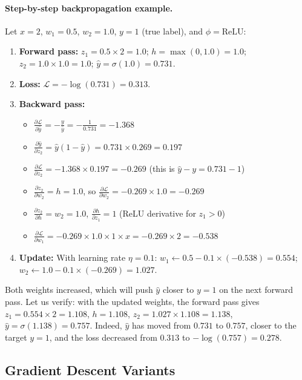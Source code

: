 \paragraph{Step-by-step backpropagation example.} Let $x = 2$, $w_1 = 0.5$, $w_2 = 1.0$, $y = 1$ (true label), and $\phi = \text{ReLU}$:
\begin{enumerate}[leftmargin=1.5em]
  \item \textbf{Forward pass:} $z_1 = 0.5 \times 2 = 1.0$; $h = \max(0, 1.0) = 1.0$; $z_2 = 1.0 \times 1.0 = 1.0$; $\hat{y} = \sigma(1.0) = 0.731$.
  \item \textbf{Loss:} $\mathcal{L} = -\log(0.731) = 0.313$.
  \item \textbf{Backward pass:}
  \begin{itemize}
    \item $\frac{\partial \mathcal{L}}{\partial \hat{y}} = -\frac{y}{\hat{y}} = -\frac{1}{0.731} = -1.368$
    \item $\frac{\partial \hat{y}}{\partial z_2} = \hat{y}(1-\hat{y}) = 0.731 \times 0.269 = 0.197$
    \item $\frac{\partial \mathcal{L}}{\partial z_2} = -1.368 \times 0.197 = -0.269$ (this is $\hat{y} - y = 0.731 - 1$)
    \item $\frac{\partial z_2}{\partial w_2} = h = 1.0$, so $\frac{\partial \mathcal{L}}{\partial w_2} = -0.269 \times 1.0 = -0.269$
    \item $\frac{\partial z_2}{\partial h} = w_2 = 1.0$, $\frac{\partial h}{\partial z_1} = 1$ (ReLU derivative for $z_1 > 0$)
    \item $\frac{\partial \mathcal{L}}{\partial w_1} = -0.269 \times 1.0 \times 1 \times x = -0.269 \times 2 = -0.538$
  \end{itemize}
  \item \textbf{Update:} With learning rate $\eta = 0.1$: $w_1 \leftarrow 0.5 - 0.1 \times (-0.538) = 0.554$; $w_2 \leftarrow 1.0 - 0.1 \times (-0.269) = 1.027$.
\end{enumerate}

Both weights increased, which will push $\hat{y}$ closer to $y = 1$ on the next forward pass. Let us verify: with the updated weights, the forward pass gives $z_1 = 0.554 \times 2 = 1.108$, $h = 1.108$, $z_2 = 1.027 \times 1.108 = 1.138$, $\hat{y} = \sigma(1.138) = 0.757$. Indeed, $\hat{y}$ has moved from $0.731$ to $0.757$, closer to the target $y=1$, and the loss decreased from $0.313$ to $-\log(0.757) = 0.278$.

\subsection{Gradient Descent Variants}

